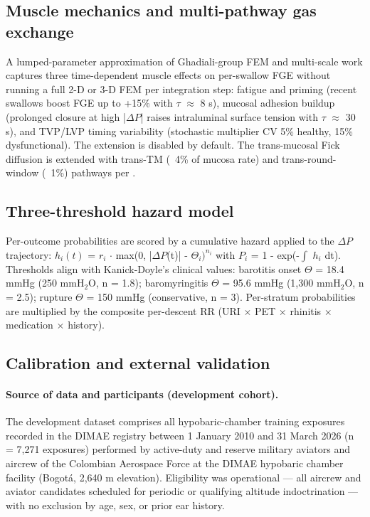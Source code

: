 \documentclass[11pt,a4paper]{article}
\begin{document}
\subsection{Muscle mechanics and multi-pathway gas exchange}

A lumped-parameter approximation of Ghadiali-group FEM and multi-scale work \citep{Ghadiali2004} captures three time-dependent muscle effects on per-swallow FGE without running a full 2-D or 3-D FEM per integration step: fatigue and priming (recent swallows boost FGE up to +15\% with $\tau$ $\approx$ 8 s), mucosal adhesion buildup (prolonged closure at high |$\Delta P$| raises intraluminal surface tension with $\tau$ $\approx$ 30 s), and TVP/LVP timing variability (stochastic multiplier CV 5\% healthy, 15\% dysfunctional). The extension is disabled by default. The trans-mucosal Fick diffusion is extended with trans-TM (~4\% of mucosa rate) and trans-round-window (~1\%) pathways per \citep{Doyle2017}.

\subsection{Three-threshold hazard model}

Per-outcome probabilities are scored by a cumulative hazard applied to the $\Delta P$ trajectory: $h_i(t)$ = $r_i$ $\cdot$ max(0, |$\Delta P$(t)| - $\Theta_i)^{n_i}$ with $P_i$ = 1 - exp(-$\int$ $h_i$ dt). Thresholds align with Kanick-Doyle's clinical values: barotitis onset $\Theta$ = 18.4 mmHg (250 mmH$_{2}$O, n = 1.8); baromyringitis $\Theta$ = 95.6 mmHg (1,300 mmH$_{2}$O, n = 2.5); rupture $\Theta$ = 150 mmHg (conservative, n = 3). Per-stratum probabilities are multiplied by the composite per-descent RR (URI $\times$ PET $\times$ rhinitis $\times$ medication $\times$ history).

\subsection{Calibration and external validation}

\paragraph{Source of data and participants (development cohort).}
The development dataset comprises all hypobaric-chamber training exposures recorded in the DIMAE registry between 1 January 2010 and 31 March 2026 (n = 7,271 exposures) performed by active-duty and reserve military aviators and aircrew of the Colombian Aerospace Force at the DIMAE hypobaric chamber facility (Bogotá, 2,640 m elevation). Eligibility was operational --- all aircrew and aviator candidates scheduled for periodic or qualifying altitude indoctrination --- with no exclusion by age, sex, or prior ear history.
\end{document}
